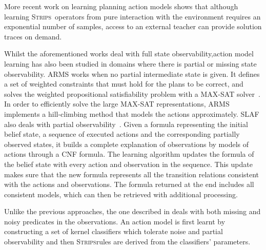 \documentclass[3p,times]{elsarticle}
\newcommand{\strips}{\textsc{Strips}}     %
\begin{document}
More recent work on learning planning action models \cite{WalshL08} shows that although learning \strips\ operators from pure interaction with the environment requires an exponential number of samples, access to an external teacher can provide solution traces on demand.

Whilst the aforementioned works deal with full state observability,action model learning has also been studied in domains where there is partial or missing state observability. {\sf ARMS} works when no partial intermediate state is given. It defines a set of weighted constraints that must hold for the plans to be correct, and solves the weighted propositional satisfiability problem with a MAX-SAT solver~\cite{yang2007learning}. In order to efficiently solve the large MAX-SAT representations, {\sf ARMS} implements a hill-climbing method that models the actions approximately. %
{\sc SLAF} also deals with partial observability~\cite{amir:alearning:JAIR08}. Given a formula representing the initial belief state, a sequence of executed actions and the corresponding partially observed states, it builds a complete explanation of observations by models of actions through a CNF formula. The learning algorithm updates the formula of the belief state with every action and observation in the sequence. This update makes sure that the new formula represents all the transition relations consistent with the actions and observations. The formula returned at the end includes all consistent models, which can then be retrieved with additional processing.

Unlike the previous approaches, the one described in \cite{MouraoZPS12} deals with both missing and noisy predicates in the observations. An action model is first learnt by constructing a set of kernel classifiers which tolerate noise and partial observability and then \strips rules are derived from the classifiers' parameters.
\end{document}
